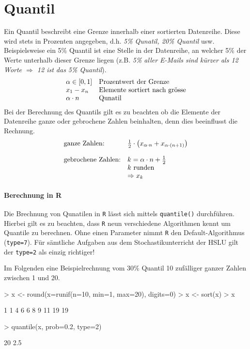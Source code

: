 \section{Quantil}
Ein \gls{Quantil} beschreibt eine Grenze innerhalb einer sortierten 
Datenreihe. Diese wird stets in Prozenten angegeben, d.h. 
\emph{5\% Qunatil, 20\% Quantil} usw. 
Beispielsweise ein 5\% Quantil ist eine Stelle in der Datenreihe, an 
welcher 5\% der Werte unterhalb dieser Grenze liegen (z.B. \emph{5\% 
aller E-Mails sind kürzer als 12 Worte $\Rightarrow$ 12 ist das 5\%
Quantil}).
\[ \begin{array}{l l}
	\alpha \in [0, 1] 
		& \text{Prozentwert der Grenze} \\
	x_1 - x_n
		& \text{Elemente sortiert nach grösse} \\
	\alpha \cdot n 
		& \text{Qunatil} \\
\end{array} \]
Bei der Berechnung des Quantils gilt es zu beachten ob die Elemente 
der Datenreihe ganze oder gebrochene Zahlen beinhalten, denn dies 
beeinflusst die Rechnung.
\[ \begin{array}{l l}
	\text{ganze Zahlen:}
		& \frac{1}{2} \cdot \left(
			x_{\alpha \cdot n} 
			+ x_{\alpha \cdot (n + 1)} \right)  \\
	& \\
	\text{gebrochene Zahlen:}
		& k = \alpha \cdot n + \frac{1}{2}  \\
		& k \text{ runden} \\
		& \Rightarrow x_{k}
\end{array} \]

\paragraph{Berechnung in R}
Die Brechnung von Qunatilen in \lstinline{R} lässt sich mittels 
\lstinline{quantile()} durchführen. Hierbei gilt es zu beachten, dass
\lstinline{R} neun verschiedene Algorithmen kennt um Quantile zu 
berechnen. Ohne einen Parameter nimmt \lstinline{R} den 
Default-Algorithmus (\lstinline{type=7}). Für sämtliche Aufgaben aus dem
Stochastikunterricht der HSLU gilt der \lstinline{type=2} als einzig
richtiger! 

Im Folgenden eine Beispielrechnung vom 30\% \gls{Quantil} 10 zufälliger 
ganzer Zahlen zwischen 1 und 20.
\begin{Schunk}
\begin{Sinput}
> x <- round(x=runif(n=10, min=1, max=20), digits=0)
> x <- sort(x)
> x
\end{Sinput}
\begin{Soutput}
 [1]  1  1  4  6  6  8  9 11 19 19
\end{Soutput}
\begin{Sinput}
> quantile(x, prob=0.2, type=2)
\end{Sinput}
\begin{Soutput}
20%
2.5 
\end{Soutput}
\end{Schunk}

